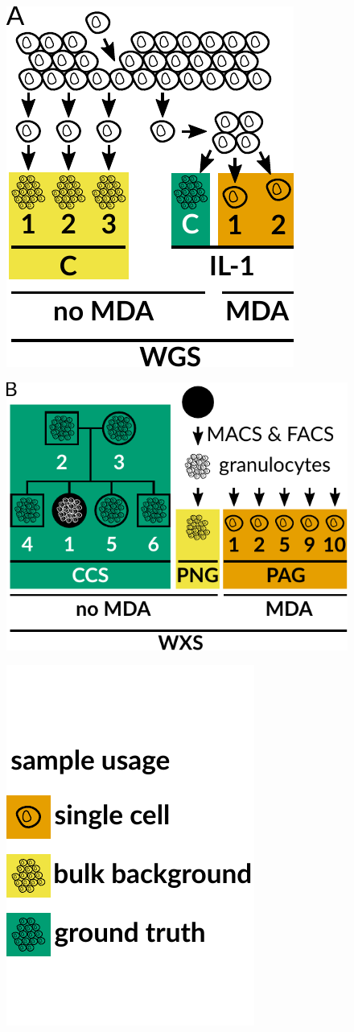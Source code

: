 \documentclass[fleqn,12pt,inline]{wlscirep}
\begin{document}
\begin{figure}[!tpb]
  \centering
  \begin{minipage}{.26\linewidth}
    \includegraphics[height=32ex]{figs/Dong2017_data_overview.pdf} \\
  \end{minipage}
  \hspace{4ex}
  \begin{minipage}{.4\linewidth}
    \includegraphics[height=32ex]{figs/Laehnemann2017_data_overview.pdf} \\
  \end{minipage}
  \hspace{4ex}
  \begin{minipage}{.22\linewidth}
    \includegraphics[height=32ex]{figs/data_overview_color_legend.pdf} \\

\end{minipage}
\end{figure}
\end{document}
